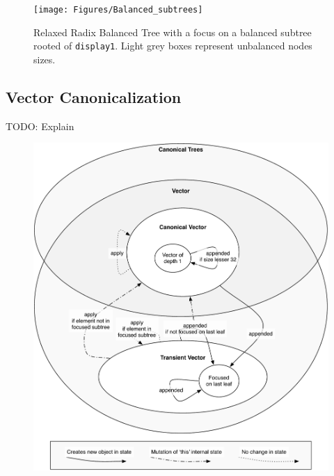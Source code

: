 \begin{figure}[h!]
  \centering
  \texttt{[image: Figures/Balanced\_subtrees]}
  \caption{Relaxed Radix Balanced Tree with a focus on a balanced subtree rooted of \texttt{display1}. Light grey boxes represent unbalanced nodes sizes.}
  \label{Balanced_subtrees}
\end{figure}


\subsection{Vector Canonicalization}
\color{red} TODO: Explain \color{black}

\begin{figure}[h!]
  \centering
  \includegraphics[width=\textwidth]{Figures/StatesGraphSimple}
  \caption{}
  \label{StatesGraphSimple}
\end{figure}



